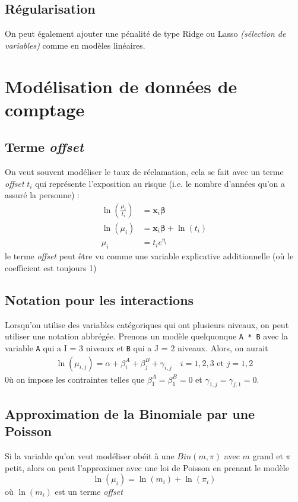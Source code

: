 \documentclass[10pt, french]{article}
\begin{document}
\begin{multicols*}{3}
\subsection*{Régularisation}

On peut également ajouter une pénalité de type Ridge ou Lasso \textit{(sélection de variables)} comme en modèles linéaires.


\section{Modélisation de données de comptage}

\subsection*{Terme \emph{offset}}
On veut souvent modéliser le taux  de réclamation, cela se fait avec un terme \emph{offset} $t_i$ qui représente l'exposition au risque (i.e. le nombre d'années qu'on a assuré la personne) : 
\begin{align*}
\ln \left( \frac{\mu_i}{t_i} \right) & = \bm{x}_i \bm{\beta} \\
\ln (\mu_i) & = \bm{x}_i \bm{\beta} + \ln (t_i) \\
\mu_i & = t_i e^{\eta_i}
\end{align*}
le terme \emph{offset} peut être vu comme une variable explicative additionnelle (où le coefficient est toujours 1)

\subsection*{Notation pour les interactions}
Lorsqu'on utilise des variables catégoriques qui ont plusieurs niveaux, on peut utiliser une notation abbrégée. Prenons un modèle quelquonque \verb=A * B= avec la variable \verb=A= qui a I = 3 niveaux et \verb=B= qui a J = 2 niveaux. Alors, on aurait
\begin{align*}
\ln (\mu_{i,j}) = \alpha + \beta_i^A + \beta_j^B + \gamma_{i,j} \quad i = 1,2,3 \text{ et } j = 1,2
\end{align*}
0ù on impose les contraintes telles que $\beta_1^A = \beta_1^B = 0$ et $\gamma_{1,j} = \gamma_{j,1} = 0$. 

\subsection*{Approximation de la Binomiale par une Poisson}
Si la variable qu'on veut modéliser obéit à une $Bin(m, \pi)$ avec $m$ grand et $\pi$ petit, alors on peut l'approximer avec une loi de Poisson en prenant le modèle
\[\ln(\mu_i) = \ln(m_i) + \ln(\pi_i) \]
où $\ln(m_i)$ est un terme \emph{offset}


\end{multicols*}
\end{document}

